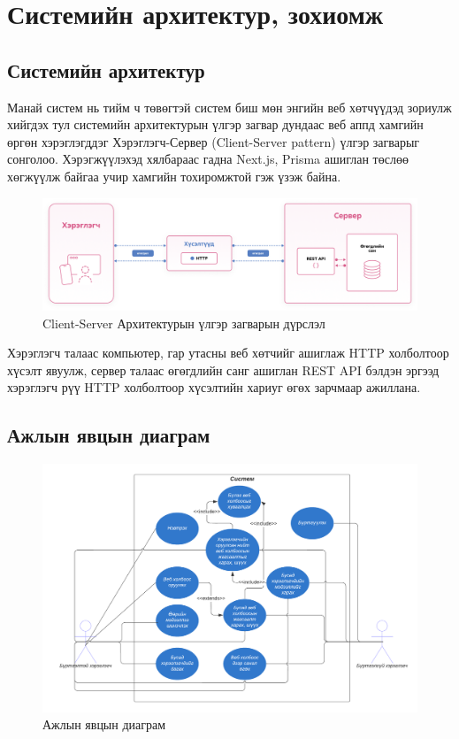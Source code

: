 \chapter{Системийн архитектур, зохиомж}

\section{Системийн архитектур}

Манай систем нь тийм ч төвөгтэй систем биш мөн энгийн веб хөтчүүдэд зориулж хийгдэх тул системийн архитектурын үлгэр загвар дундаас веб аппд хамгийн өргөн хэрэглэгддэг Хэрэглэгч-Сервер (Client-Server pattern) үлгэр загварыг сонголоо. Хэрэгжүүлэхэд хялбараас гадна Next.js, Prisma ашиглан төслөө хөгжүүлж байгаа учир хамгийн тохиромжтой гэж үзэж байна.

\begin{figure}[h]
	\centering
	\includegraphics[width=15cm]{images/architecture.png}
	\caption{Client-Server Архитектурын үлгэр загварын дүрслэл}
	\label{fig:architecture}
\end{figure}

Хэрэглэгч талаас компьютер, гар утасны веб хөтчийг ашиглаж HTTP холболтоор хүсэлт явуулж, сервер талаас өгөгдлийн санг ашиглан REST API бэлдэн эргээд хэрэглэгч рүү HTTP холболтоор хүсэлтийн хариуг өгөх зарчмаар ажиллана.

\section{Ажлын явцын диаграм}

\begin{figure}[h]
	\centering
	\includegraphics[width=15cm]{images/usecase.png}
	\caption{Ажлын явцын диаграм}
	\label{fig:architecture}
\end{figure}

